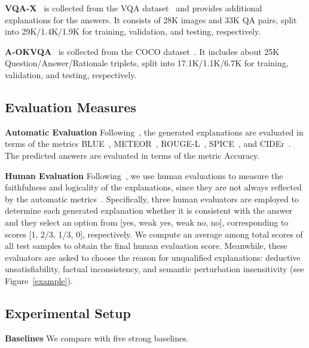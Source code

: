 \documentclass[letterpaper]{article} %
\begin{document}
\noindent
\textbf{VQA-X}~\cite{park2018multimodal} is collected from the VQA dataset~\cite{antol2015vqa} and provides additional explanations for the answers. It consists of 28K images and 33K QA pairs, split into 29K/1.4K/1.9K for training, validation, and testing, respectively. 

\noindent
\textbf{A-OKVQA}~\cite{schwenk2022okvqa} is collected from the COCO dataset~\cite{lin2014microsoft}. It includes about 25K Question/Answer/Rationale triplets, split into 17.1K/1.1K/6.7K for training, validation, and testing, respectively. 


\subsection{Evaluation Measures}
\textbf{Automatic Evaluation} Following~\cite{suo2023s3c}, the generated explanations are evaluated in terms of the metrics BLUE~\cite{papineni2002bleu}, METEOR~\cite{denkowski2014meteor}, ROUGE-L~\cite{lin2004rouge}, SPICE~\cite{anderson2016spice}, and CIDEr~\cite{vedantam2015cider}. The predicted answers are evaluated in terms of the metric Accuracy. 

\noindent
\textbf{Human Evaluation} Following~\cite{suo2023s3c}, we use human evaluations to measure the faithfulness and logicality of the explanations, since they are not always reflected by the automatic metrics~\cite{kayser2021vil}. Specifically, three human evaluators are employed to determine each generated explanation whether it is consistent with the answer and they select an option from [yes, weak yes, weak no, no], corresponding to scores [1, 2/3, 1/3, 0], respectively. We compute an average among total scores of all test samples to obtain the final human evaluation score. Meanwhile, these evaluators are asked to choose the reason for unqualified explanations: deductive unsatisfiability, factual inconsistency, and semantic perturbation insensitivity (see Figure~\ref{example}).


\subsection{Experimental Setup}

\noindent
\textbf{Baselines} We compare with five strong baselines. 
\end{document}

